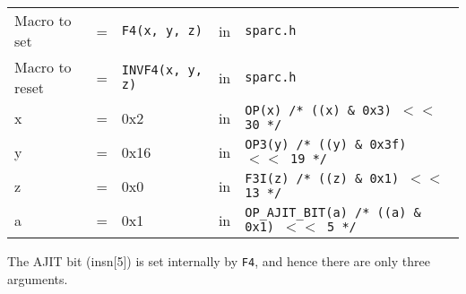 \begin{enumerate}
  \begin{tabular}[h]{lclcl}
    Macro to set  &=& \texttt{F4(x, y, z)} &in& \texttt{sparc.h}     \\
    Macro to reset  &=& \texttt{INVF4(x, y, z)} &in& \texttt{sparc.h}     \\
    x &=& 0x2      &in& \texttt{OP(x)  /* ((x) \& 0x3)  $<<$ 30 */} \\
    y &=& 0x16     &in& \texttt{OP3(y) /* ((y) \& 0x3f) $<<$ 19 */} \\
    z &=& 0x0      &in& \texttt{F3I(z) /* ((z) \& 0x1)  $<<$ 13 */} \\
    a &=& 0x1      &in& \texttt{OP\_AJIT\_BIT(a) /* ((a) \& 0x1)  $<<$ 5 */}
  \end{tabular}

  The AJIT bit  (insn[5]) is set internally by  \texttt{F4}, and hence
  there are only three arguments.


\end{enumerate}

